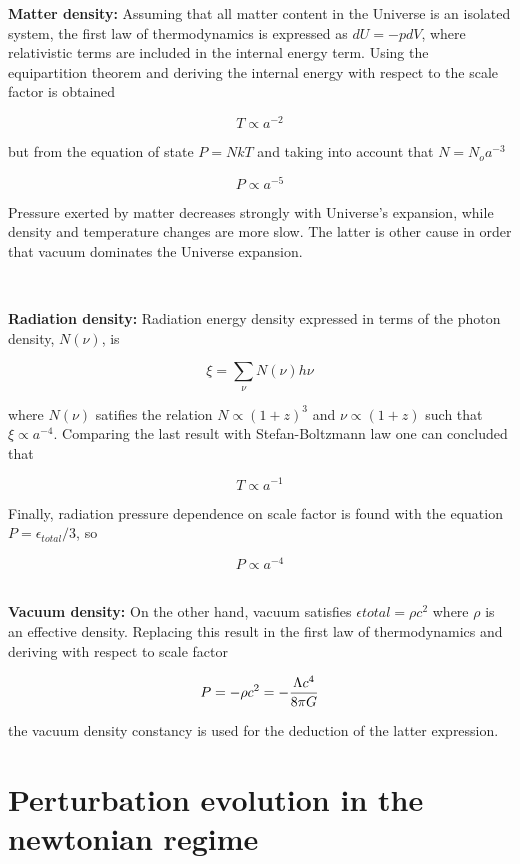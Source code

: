 \textbf{Matter density:} Assuming that all matter content in the Universe is an 
isolated system, the first law of thermodynamics is expressed as $dU = -pdV$, 
where relativistic terms are included in the internal energy term. 
Using the equipartition theorem and deriving the internal energy with respect to 
the scale factor is obtained

\[ T \propto a^{-2} \]

but from the equation of state $P = NkT$ and taking into account that $N = N_oa^{-3}$  

\begin{equation}
P \propto a^{-5}
\end{equation}


Pressure exerted by matter decreases strongly with Universe's expansion, while density 
and temperature changes are more slow. The latter is other cause in order that vacuum 
dominates the Universe expansion.

\

\textbf{Radiation density:} Radiation energy density expressed in terms of the 
photon density, $N(\nu)$, is 

\[\xi=\sum_{\nu}N(\nu)h\nu\]

where $N(\nu)$ satifies the relation $N \propto (1+z)^3$ and $\nu \propto (1+z)$ 
such that $\xi \propto a^{-4} $. Comparing the last result with Stefan-Boltzmann law 
one can concluded that 

\[T\propto a^{-1}\]
 
Finally, radiation pressure dependence on scale factor is found with the equation 
$ P=\epsilon_{total}/3$, so

\begin{equation}
P \propto a^{-4}
\end{equation}
\

\textbf{Vacuum density:} On the other hand, vacuum satisfies $\epsilon {total}=\rho c^2$ 
where $\rho$ is an effective density. Replacing this result in the first law of thermodynamics
and deriving with respect to scale factor

\begin{equation}
 P=-\rho c^2 = -\frac{ \Lambda c^4}{8\pi G}
\end{equation}

the vacuum density constancy is used for the deduction of the latter expression.

\section{ Perturbation evolution in the newtonian regime }

